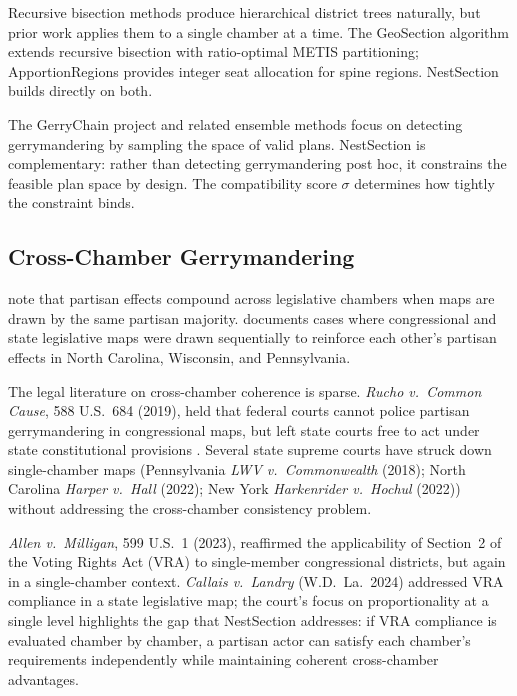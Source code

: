 Recursive bisection methods \citep{simon1991} produce hierarchical district
trees naturally, but prior work applies them to a single chamber at a time.
The GeoSection algorithm \citep{B8} extends recursive bisection with
ratio-optimal METIS partitioning; ApportionRegions \citep{B11} provides
integer seat allocation for spine regions.  NestSection builds directly on
both.

The GerryChain project \citep{deford2019} and related ensemble methods focus
on detecting gerrymandering by sampling the space of valid plans.  NestSection
is complementary: rather than detecting gerrymandering post hoc, it constrains
the feasible plan space by design.  The compatibility score $\sigma$ determines
how tightly the constraint binds.

\subsection{Cross-Chamber Gerrymandering}

\citet{gelman1994} note that partisan effects compound across legislative
chambers when maps are drawn by the same partisan majority.  \citet{chen2020}
documents cases where congressional and state legislative maps were drawn
sequentially to reinforce each other's partisan effects in North Carolina,
Wisconsin, and Pennsylvania.

The legal literature on cross-chamber coherence is sparse.  \textit{Rucho v.\
Common Cause}, 588 U.S.\ 684 (2019), held that federal courts cannot police
partisan gerrymandering in congressional maps, but left state courts free to
act under state constitutional provisions \citep{miller2019}.  Several state
supreme courts have struck down single-chamber maps (Pennsylvania \textit{LWV
v.\ Commonwealth} (2018); North Carolina \textit{Harper v.\ Hall} (2022);
New York \textit{Harkenrider v.\ Hochul} (2022)) without addressing the
cross-chamber consistency problem.

\textit{Allen v.\ Milligan}, 599 U.S.\ 1 (2023), reaffirmed the applicability
of Section~2 of the Voting Rights Act (VRA) to single-member congressional
districts, but again in a single-chamber context.  \textit{Callais v.\ Landry}
(W.D.\ La.\ 2024) addressed VRA compliance in a state legislative map; the
court's focus on proportionality at a single level highlights the gap that
NestSection addresses: if VRA compliance is evaluated chamber by chamber, a
partisan actor can satisfy each chamber's requirements independently while
maintaining coherent cross-chamber advantages.

